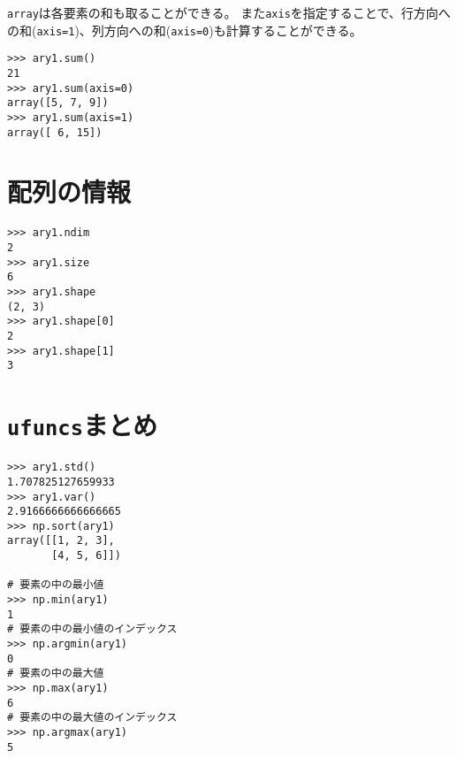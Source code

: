 {\tt array}は各要素の和も取ることができる。
また{\tt axis}を指定することで、行方向への和({\tt axis=1})、列方向への和({\tt axis=0})も計算することができる。

\begin{verbatim}
>>> ary1.sum()
21
>>> ary1.sum(axis=0)
array([5, 7, 9])
>>> ary1.sum(axis=1)
array([ 6, 15])
\end{verbatim}


\section{配列の情報}

\begin{verbatim}
>>> ary1.ndim
2
>>> ary1.size
6
>>> ary1.shape
(2, 3)
>>> ary1.shape[0]
2
>>> ary1.shape[1]
3
\end{verbatim}

\section{{\tt ufuncs}まとめ}

\begin{verbatim}
>>> ary1.std()
1.707825127659933
>>> ary1.var()
2.9166666666666665
>>> np.sort(ary1)
array([[1, 2, 3],
       [4, 5, 6]])
       
# 要素の中の最小値
>>> np.min(ary1)
1
# 要素の中の最小値のインデックス
>>> np.argmin(ary1)
0
# 要素の中の最大値
>>> np.max(ary1)
6
# 要素の中の最大値のインデックス
>>> np.argmax(ary1)
5
\end{verbatim}


